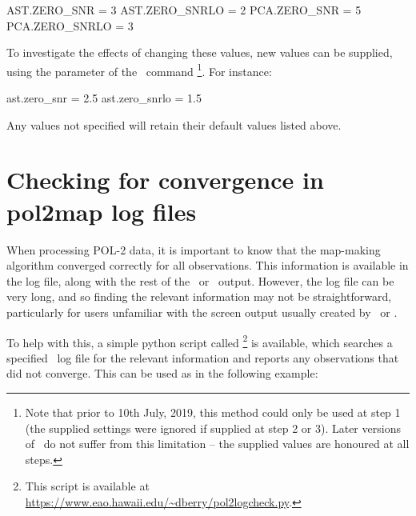 \begin{terminalv}
AST.ZERO_SNR = 3 
AST.ZERO_SNRLO = 2 
PCA.ZERO_SNR = 5 
PCA.ZERO_SNRLO = 3
\end{terminalv}

To investigate the effects of changing these values, new values can be supplied, using the 
 parameter of the \poltwomap\ command \footnote{Note that prior to 10th July, 2019, this method could only be used at step 1 (the supplied settings were ignored if supplied at step 2 or 3). Later versions of \poltwomap\ do not suffer from this limitation -- the supplied values are honoured at all steps.}. For instance:

\begin{terminalv}
ast.zero_snr = 2.5
ast.zero_snrlo = 1.5
\end{terminalv}

Any values not specified will retain their default values listed above.


\section{Checking for convergence in pol2map log files}

When processing POL-2 data, it is important to know that the map-making algorithm converged 
correctly for all observations. This information is available in the \poltwomap log file, along with 
the rest of the \makemap\ or \skyloop\ output.  However, the log file can be very long, and 
so finding the relevant information may not be straightforward, particularly for users unfamiliar 
with the screen output usually created by \makemap\ or \skyloop.

To help with this, a simple python script called \footnote{This script is available at \url{https://www.eao.hawaii.edu/~dberry/pol2logcheck.py}.} is available, which searches a specified \poltwomap\ log file for the relevant information and reports any observations that did not converge. This can be used as in the following example:



